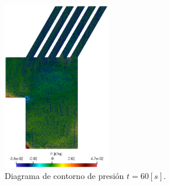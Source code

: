 \begin{figure}[h!]
	\centering
	\includegraphics[width=0.42\textwidth]{Images/CFDEM/p.png}
	\caption{Diagrama de contorno de presi\'on $t=60 [s]$.}
	\label{CFDEM:p}
\end{figure}